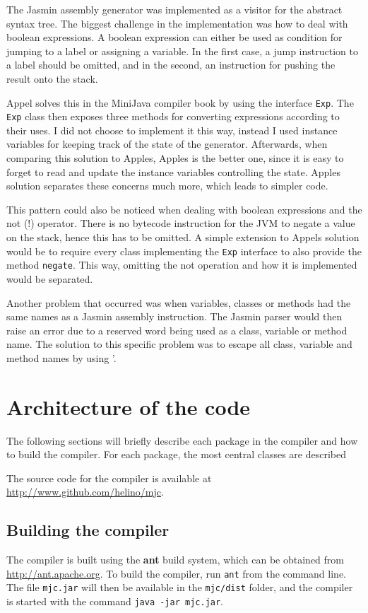 \documentclass[11pt,oneside,a4paper]{article}
\newcommand{\code}[1]{\texttt{#1}}
\newcommand{\file}[1]{\texttt{#1}}
\newcommand{\folder}[1]{\texttt{#1}}
\newcommand{\command}[1]{\texttt{#1}}
\begin{document}
The Jasmin assembly generator was implemented as a visitor for the abstract
syntax tree. The biggest challenge in the implementation was how to deal with
boolean expressions. A boolean expression can either be used as condition for
jumping to a label or assigning a variable. In the first case, a jump
instruction to a label should be omitted, and in the second, an instruction for
pushing the result onto the stack.

Appel solves this in the MiniJava compiler book by using the interface
\code{Exp}. The \code{Exp} class then exposes three methods for converting
expressions according to their uses. 
I did not choose to implement it this way, instead I used instance variables
for keeping track of the state of the generator. Afterwards, when comparing this
solution to Apples, Apples is the better one, since it is easy to forget to
read and update the instance variables controlling the state. Apples solution
separates these concerns much more, which leads to simpler code.

This pattern could also be noticed when dealing with boolean expressions and
the not (!) operator. There is no bytecode instruction for the JVM to negate a
value on the stack, hence this has to be omitted. A simple extension to Appels
solution would be to require every class implementing the \code{Exp}
interface to also provide the method \code{negate}. This way, omitting the
not operation and how it is implemented would be separated.

Another problem that occurred was when variables, classes or methods had the
same names as a Jasmin assembly instruction. The Jasmin parser would then
raise an error due to a reserved word being used as a class, variable or 
method name. The solution to this specific problem was to escape all class, 
variable and method names by using '.

\section{Architecture of the code}
The following sections will briefly describe each package in the compiler and
how to build the compiler. For each package, the most central classes are
described

The source code for the compiler is available at 
\href{http://www.github.com/helino/mjc}{http://www.github.com/helino/mjc}.

\subsection{Building the compiler}
The compiler is built using the \textbf{ant} build system, which can be 
obtained from \href{http://ant.apache.org}{http://ant.apache.org}. 
To build the compiler, run \command{ant} from the command line. 
The file \file{mjc.jar} will then be available in the
\folder{mjc/dist} folder, and the compiler is started with the command 
\command{java -jar mjc.jar}.
\end{document}
